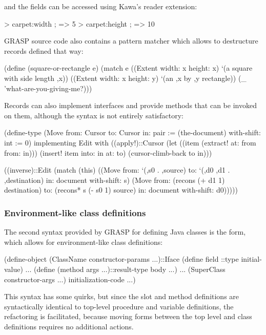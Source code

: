 \documentclass[sigconf]{acmart}
\newenvironment{Snippet}{\Verbatim[samepage=true]}{\endVerbatim}
\begin{document}
and the fields can be accessed using Kawa's reader
extension:

\begin{Snippet}
> carpet:width ; => 5
> carpet:height ; => 10
\end{Snippet}

GRASP source code also contains a pattern matcher
which allows to destructure records defined that way:

\begin{Snippet}
(define (square-or-rectangle e)
  (match e
    ((Extent width: x height: x)
     `(a square with side length ,x))
    ((Extent width: x height: y)
     `(an ,x by ,y rectangle))
    (_
     'what-are-you-giving-me?)))
\end{Snippet}

Records can also implement interfaces and provide methods
that can be invoked on them, although the syntax is not 
entirely satisfactory:

\begin{Snippet}
(define-type (Move from: Cursor
		   to: Cursor
		   in: pair := (the-document)
		   with-shift: int := 0)
  implementing Edit
  with
  ((apply!)::Cursor
   (let ((item (extract! at: from from: in)))
     (insert! item into: in at: to)
     (cursor-climb-back to in)))

  ((inverse)::Edit
   (match (this)
     ((Move from: `(,s0 . ,source)
	    to: `(,d0 ,d1 . ,destination)
	    in: document
	    with-shift: s)
      (Move from: (recons (+ d1 1) destination)
	    to: (recons* s (- s0 1) source)
	    in: document
	    with-shift: d0)))))
\end{Snippet}

\subsubsection{Environment-like class definitions}

The second syntax provided by GRASP for defining
Java classes is the form, which allows
for environment-like class definitions:

\begin{Snippet}
(define-object (ClassName constructor-params ...)::Iface
  (define field ::type initial-value)
  ...
  (define (method args ...)::result-type body ...)
  ...
  (SuperClass constructor-args ...)
  initialization-code ...)
\end{Snippet}

This syntax has some quirks, but since the slot and method
definitions are syntactically identical to top-level procedure
and variable definitions, the refactoring is facilitated,
because moving forms between the top level and class definitions
requires no additional actions.
\end{document}

